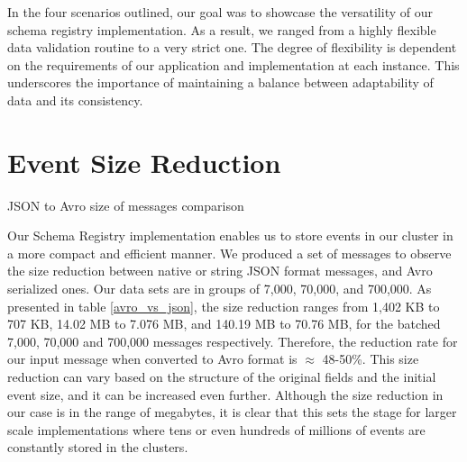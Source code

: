 In the four scenarios outlined, our goal was to showcase the versatility of our schema registry implementation. As a result, we ranged from a highly flexible data validation routine to a very strict one. The degree of flexibility is dependent on the requirements of our application and implementation at each instance. This underscores the importance of maintaining a balance between adaptability of data and its consistency.



\section{Event Size Reduction}

\begin{table}[htbp]
\centering
{}
\caption{JSON to Avro size of messages comparison }
\label{avro_vs_json}
\end{table}
Our Schema Registry implementation enables us to store events in our cluster in a more compact and efficient manner. We produced a set of messages to observe the size reduction between native or string JSON format messages, and Avro serialized ones. Our data sets are in groups of 7,000, 70,000, and 700,000. As presented in table \ref{avro_vs_json}, the size reduction ranges from 1,402 KB to 707 KB, 14.02 MB to 7.076 MB, and 140.19 MB to 70.76 MB, for the batched 7,000, 70,000 and 700,000 messages respectively. Therefore, the reduction rate for our input message when converted to Avro format is $\approx$ 48-50\%. This size reduction can vary based on the structure of the original fields and the initial event size, and it can be increased even further. Although the size reduction in our case is in the range of megabytes, it is clear that this sets the stage for larger scale implementations where tens or even hundreds of millions of events are constantly stored in the clusters.



